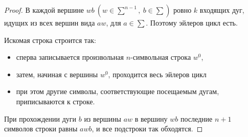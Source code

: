 \begin{proof}
    В каждой вершине $wb~(w \in \sum^{n - 1},~b \in \sum)$ ровно $k$ входящих дуг, идущих из всех вершин вида $aw$, для $a \in \sum$. Поэтому эйлеров цикл есть.

    Искомая строка строится так:

    \begin{itemize}
        \item сперва записывается произвольная $n$-символьная строка $w^0$,
        
        \item затем, начиная с вершины $w^0$, проходится весь эйлеров цикл
        
        \item при этом другие символы, соответствующие посещаемым дугам, приписываются к строке.
        
    \end{itemize}

    При прохождении дуги $b$ из вершины $aw$ в вершину $wb$ последние $n + 1$ символов строки равны $awb$, и все подстроки так обходятся.    
\end{proof}